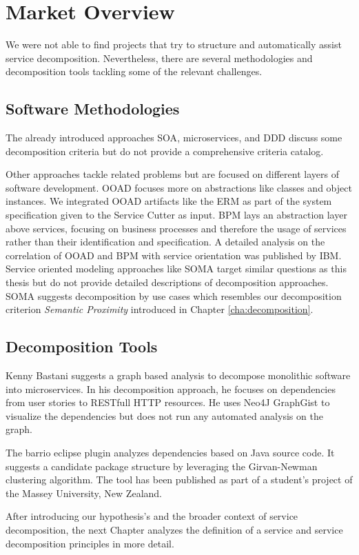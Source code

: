 \section{Market Overview}

We were not able to find projects that try to structure and automatically assist service decomposition. Nevertheless, there are several methodologies and decomposition tools tackling some of the relevant challenges. 

\subsection{Software Methodologies}

The already introduced approaches \gls{SOA}, microservices, and \gls{DDD} discuss some decomposition criteria but do not provide a comprehensive criteria catalog. 

Other approaches tackle related problems but are focused on different layers of software development. \gls{OOAD} focuses more on abstractions like classes and object instances. We integrated \gls{OOAD} artifacts like the \gls{ERM} as part of the system specification given to the Service Cutter as input. \gls{BPM} lays an abstraction layer above services, focusing on business processes and therefore the usage of services rather than their identification and specification. A detailed analysis on the correlation of \gls{OOAD} and \gls{BPM} with service orientation was published by IBM\cite{zimmermann2004elements}. Service oriented modeling approaches like \gls{SOMA}\cite{arsanjani2004service} target similar questions as this thesis but do not provide detailed descriptions of decomposition approaches. \gls{SOMA} suggests decomposition by use cases which resembles our decomposition criterion \textit{Semantic Proximity} introduced in Chapter \ref{cha:decomposition}.

\subsection{Decomposition Tools}

Kenny Bastani suggests a graph based analysis to decompose monolithic software into microservices\cite{bastani}. In his decomposition approach, he focuses on dependencies from user stories to RESTfull HTTP resources. He uses Neo4J GraphGist\cite{graphGist} to visualize the dependencies but does not run any automated analysis on the graph. 

The barrio eclipse plugin\cite{dietrich2008cluster} analyzes dependencies based on Java source code. It suggests a candidate package structure by leveraging the Girvan-Newman clustering algorithm. The tool has been published as part of a student's project of the Massey University, New Zealand.

\bigskip

After introducing our hypothesis's and the broader context of service decomposition, the next Chapter analyzes the definition of a service and service decomposition principles in more detail. 

